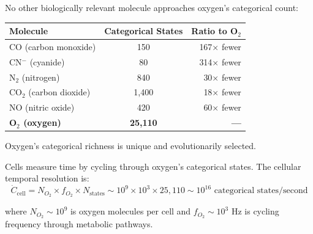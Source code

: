 \begin{proposition}
No other biologically relevant molecule approaches oxygen's categorical count:

\begin{table}[H]
\centering
\begin{tabular}{lcr}
\toprule
\textbf{Molecule} & \textbf{Categorical States} & \textbf{Ratio to O\(_2\)} \\
\midrule
CO (carbon monoxide) & 150 & 167× fewer \\
CN\(^-\) (cyanide) & 80 & 314× fewer \\
N\(_2\) (nitrogen) & 840 & 30× fewer \\
CO\(_2\) (carbon dioxide) & 1{,}400 & 18× fewer \\
NO (nitric oxide) & 420 & 60× fewer \\
\textbf{O\(_2\) (oxygen)} & \textbf{25{,}110} & \textbf{—} \\
\bottomrule
\end{tabular}
\end{table}

Oxygen's categorical richness is unique and evolutionarily selected.
\end{proposition}

\begin{theorem}
\label{thm:oxygen_temporal_clock}
Cells measure time by cycling through oxygen's categorical states. The cellular temporal resolution is:
\begin{equation}
\dot{C}_{\text{cell}} = N_{O_2} \times f_{O_2} \times N_{\text{states}} \sim 10^9 \times 10^3 \times 25{,}110 \sim 10^{16} \text{ categorical states/second}
\end{equation}

where $N_{O_2} \sim 10^9$ is oxygen molecules per cell and $f_{O_2} \sim 10^3$ Hz is cycling frequency through metabolic pathways.
\end{theorem}


